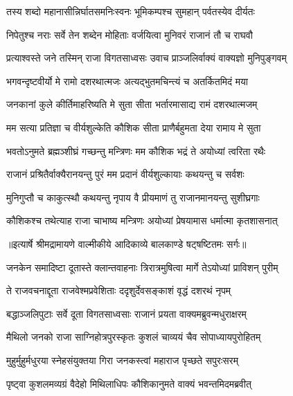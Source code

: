 \twolineshloka
{तस्य शब्दो महानासीन्निर्घातसमनिःस्वनः}
{भूमिकम्पश्च सुमहान् पर्वतस्येव दीर्यतः} %

\twolineshloka
{निपेतुश्च नराः सर्वे तेन शब्देन मोहिताः}
{वर्जयित्वा मुनिवरं राजानं तौ च राघवौ} %

\twolineshloka
{प्रत्याश्वस्ते जने तस्मिन् राजा विगतसाध्वसः}
{उवाच प्राञ्जलिर्वाक्यं वाक्यज्ञो मुनिपुङ्गवम्} %

\twolineshloka
{भगवन्दृष्टवीर्यो मे रामो दशरथात्मजः}
{अत्यद्भुतमचिन्त्यं च अतर्कितमिदं मया} %

\twolineshloka
{जनकानां कुले कीर्तिमाहरिष्यति मे सुता}
{सीता भर्तारमासाद्य रामं दशरथात्मजम्} %

\twolineshloka
{मम सत्या प्रतिज्ञा च वीर्यशुल्केति कौशिक}
{सीता प्राणैर्बहुमता देया रामाय मे सुता} %

\twolineshloka
{भवतोऽनुमते ब्रह्मञ्शीघ्रं गच्छन्तु मन्त्रिणः}
{मम कौशिक भद्रं ते अयोध्यां त्वरिता रथैः} %

\twolineshloka
{राजानं प्रश्रितैर्वाक्यैरानयन्तु पुरं मम}
{प्रदानं वीर्यशुल्कायाः कथयन्तु च सर्वशः} %

\twolineshloka
{मुनिगुप्तौ च काकुत्स्थौ कथयन्तु नृपाय वै}
{प्रीयमाणं तु राजानमानयन्तु सुशीघ्रगाः} %

\twolineshloka
{कौशिकश्च तथेत्याह राजा चाभाष्य मन्त्रिणः}
{अयोध्यां प्रेषयामास धर्मात्मा कृतशासनात्} %


{॥इत्यार्षे श्रीमद्रामायणे वाल्मीकीये आदिकाव्ये बालकाण्डे षट्षष्टितमः सर्गः॥}


\twolineshloka
{जनकेन समादिष्टा दूतास्ते क्लान्तवाहनाः}
{त्रिरात्रमुषित्वा मार्गे तेऽयोध्यां प्राविशन् पुरीम्} %

\twolineshloka
{ते राजवचनाद्दूता राजवेश्मप्रवेशिताः}
{ददृशुर्देवसङ्काशं वृद्धं दशरथं नृपम्} %

\twolineshloka
{बद्धाञ्जलिपुटाः सर्वे दूता विगतसाध्वसाः}
{राजानं प्रयता वाक्यमब्रुवन्मधुराक्षरम्} %

\twolineshloka
{मैथिलो जनको राजा साग्निहोत्रपुरस्कृतः}
{कुशलं चाव्ययं चैव सोपाध्यायपुरोहितम्} %

\twolineshloka
{मुहुर्मुहुर्मधुरया स्नेहसंयुक्तया गिरा}
{जनकस्त्वां महाराज पृच्छते सपुरःसरम्} %

\twolineshloka
{पृष्ट्वा कुशलमव्यग्रं वैदेहो मिथिलाधिपः}
{कौशिकानुमते वाक्यं भवन्तमिदमब्रवीत्} %


